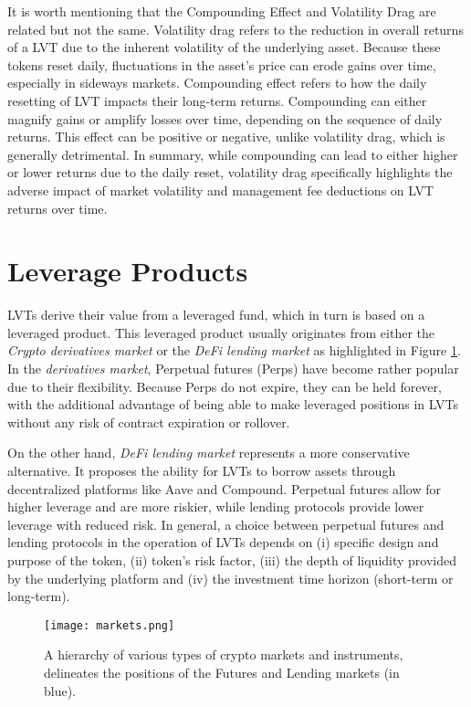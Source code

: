 It is worth mentioning that the Compounding Effect and Volatility Drag are related but not the same. Volatility drag refers to the reduction in overall returns of a LVT due to the inherent volatility of the underlying asset. Because these tokens reset daily, fluctuations in the asset’s price can erode gains over time, especially in sideways markets. Compounding effect refers to how the daily resetting of LVT impacts their long-term returns. Compounding can either magnify gains or amplify losses over time, depending on the sequence of daily returns. This effect can be positive or negative, unlike volatility drag, which is generally detrimental. In summary, while compounding can lead to either higher or lower returns due to the daily reset, volatility drag specifically highlights the adverse impact of market volatility and management fee deductions on LVT returns over time.

\section{Leverage Products}
LVTs derive their value from a leveraged fund, which in turn is based on a leveraged product. This leveraged product usually originates from either the \textit{Crypto derivatives market} or the \textit{DeFi lending market} as highlighted in Figure \ref{fig:markets}. In the \textit{derivatives market}, Perpetual futures (Perps) have become rather popular due to their flexibility. Because Perps do not expire, they can be held forever, with the additional advantage of being able to make leveraged positions in LVTs without any risk of contract expiration or rollover.

On the other hand, \textit{DeFi lending market} represents a more conservative alternative. It proposes the ability for LVTs to borrow assets through decentralized platforms like Aave and Compound. Perpetual futures allow for higher leverage and are more riskier, while lending protocols provide lower leverage with reduced risk. In general, a choice between perpetual futures and lending protocols in the operation of LVTs depends on (i) specific design and purpose of the token, (ii) token's risk factor, (iii) the depth of liquidity provided by the underlying platform and (iv) the investment time horizon (short-term or long-term).

\begin{figure}[t]
	\texttt{[image: markets.png]}
	\caption[Crypto market hierarchy]{A hierarchy of various types of crypto markets and instruments, delineates the positions of the Futures and Lending markets (in blue).}
	\label{fig:markets}
\end{figure}

